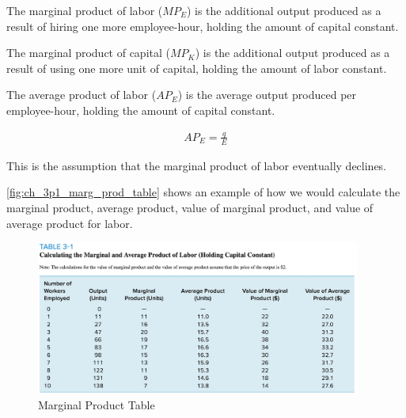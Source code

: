 \begin{definition} 
    
    The marginal product of labor ($MP_E$)
    is the additional output produced
    as a result of hiring one more
    employee-hour, holding the amount
    of capital constant.

\end{definition}

\begin{definition}

    The marginal product of capital ($MP_K$)
    is the additional output produced
    as a result of using one more
    unit of capital, holding the amount
    of labor constant.

\end{definition}

\begin{definition}

    The average product of labor ($AP_E$)
    is the average output produced per employee-hour,
    holding the amount of capital constant.

    \begin{align}
        AP_E = \frac{q}{E}
    \end{align}
    
\end{definition}

\begin{definition} 
    
    This is the assumption that the marginal 
    product of labor eventually declines.

\end{definition}


\autoref{fig:ch_3p1_marg_prod_table}
shows an example of how we would calculate 
the marginal product, average product, value of 
marginal product, and value of average product for labor.

\FloatBarrier

\begin{figure}[!htb]
    \centering
        \includegraphics[width=0.95\textwidth]{../input/ch_3p1_marg_prod_table.png}
    \caption{Marginal Product Table}
    \label{fig:ch_3p1_marg_prod_table}
\end{figure}

